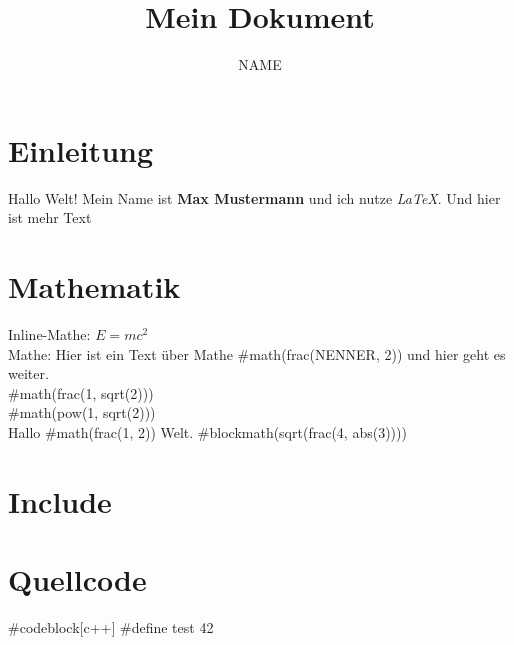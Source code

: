 \documentclass{article}
\title{Mein Dokument}
\author{NAME}
\begin{document}
\maketitle

\section{Einleitung}
Hallo Welt! 
Mein Name ist \textbf{Max Mustermann} und ich nutze \textit{LaTeX}.
Und hier ist mehr Text

\section{Mathematik}
Inline-Mathe: $E = mc^2$  \\
Mathe: Hier ist ein Text über Mathe #math(frac(NENNER, 2)) und hier geht es weiter.\\  

#math(frac(1, sqrt(2))) \\

#math(pow(1, sqrt(2))) \\

Hallo #math(frac(1, 2)) Welt.  
#blockmath(sqrt(frac(4, abs(3))))

\section{Include}


\section{Quellcode}

#codeblock[c++]{
#define test 42
}
\end{document}
